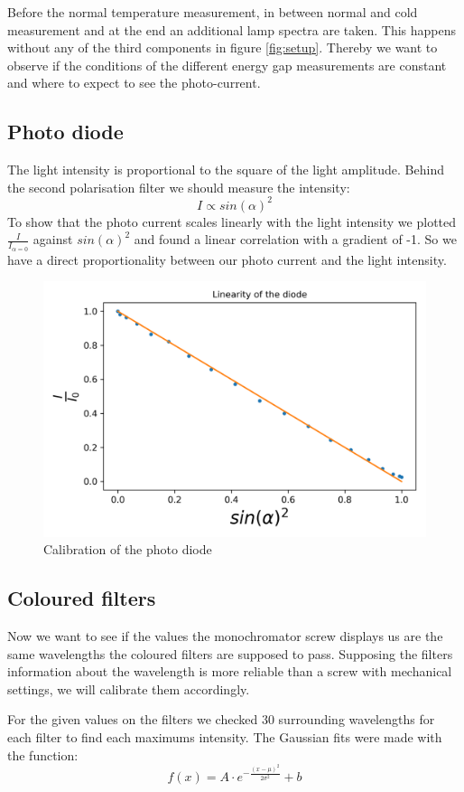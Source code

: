 \documentclass[]{article}
\begin{document}
Before the normal temperature measurement, in between normal and cold measurement and at the end an additional lamp spectra are taken. This happens without any of the third components in figure \ref{fig:setup}. Thereby we want to observe if the conditions of the different energy gap measurements are constant and where to expect to see the photo-current. 


\subsection{Photo diode}
The light intensity is proportional to the square of the light amplitude. Behind the second polarisation filter we should measure the intensity:
\begin{equation}
	I \propto sin(\alpha)^2
\end{equation}
To show that the photo current scales linearly with the light intensity we plotted $\frac{I}{I_{\alpha=0}}$ against $sin(\alpha)^2$ and found a linear correlation with a gradient of -1. So we have a direct proportionality between our photo current and the light intensity.
\begin{figure}
	\centering
	\includegraphics[width=0.7\linewidth]{Plots/IntCalibration}
	\caption{Calibration of the photo diode}
	\label{fig:intcalibration}
\end{figure}

\subsection{Coloured filters} \label{color filters}
Now we want to see if the values the monochromator screw displays us are the same wavelengths the coloured filters are supposed to pass. Supposing the filters information about the wavelength is more reliable than a screw with mechanical settings, we will calibrate them accordingly.

For the given values on the filters we checked 30 surrounding wavelengths for each filter to find each maximums intensity. The Gaussian fits were made with the function:
\begin{equation}
f(x) = A \cdot e^{-\frac{(x-\mu)^2}{2 \sigma^2}} + b
\end{equation}
\end{document}
